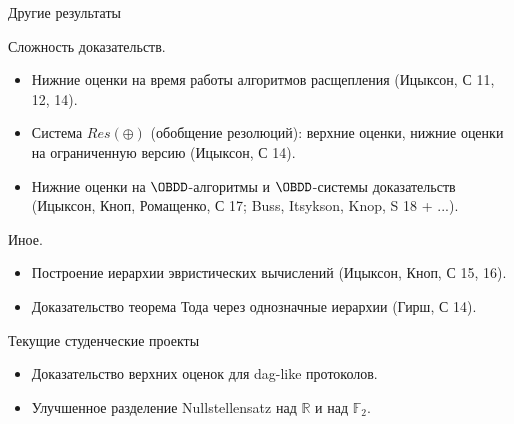 \begin{frame}{Другие результаты}

    Сложность доказательств.
    \begin{itemize}
        \item Нижние оценки на время работы алгоритмов расщепления (Ицыксон, С 11, 12, 14).
        \pause
        \item Система $Res(\oplus)$ (обобщение резолюций): верхние оценки, нижние оценки на ограниченную
            версию (Ицыксон, С 14).
        \pause
        \item Нижние оценки на $\OBDD$-алгоритмы и $\OBDD$-системы доказательств (Ицыксон, Кноп,
            Ромащенко, С 17; Buss, Itsykson, Knop, S 18 + ...).
    \end{itemize}

    \pause
    Иное.
    \begin{itemize}
        \item Построение иерархии эвристических вычислений (Ицыксон, Кноп, С 15, 16).
        \pause
        \item Доказательство теорема Тода через однозначные иерархии (Гирш, С 14).
    \end{itemize}

\end{frame}


\begin{frame}{Текущие студенческие проекты}

    \begin{itemize}
        \item Доказательство верхних оценок для dag-like протоколов.
        \pause
        \item Улучшенное разделение Nullstellensatz над $\mathbb{R}$ и над $\mathbb{F}_2$.
    \end{itemize}
\end{frame}